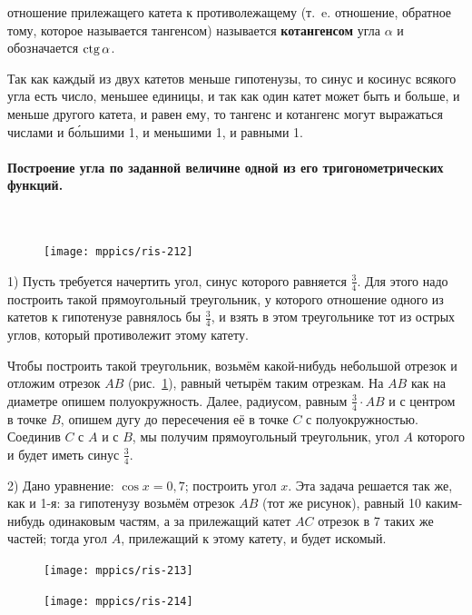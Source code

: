 \documentclass[oneside]{book}
\begin{document}
отношение прилежащего катета к противолежащему (т.~e.
отношение, обратное тому, которое называется тангенсом) называется \textbf{котангенсом} угла $\alpha$ и обозначается $\mathrm{ctg}\,\alpha$.

Так как каждый из двух катетов меньше гипотенузы, то синус и косинус всякого угла есть число, меньшее единицы, и так как один катет может быть и больше, и меньше другого катета, и равен ему, то тангенс и котангенс могут выражаться числами и б\'{о}льшими 1, и меньшими 1, и равными 1.

\paragraph{Построение угла по заданной величине одной из его тригонометрических функций.}\label{1938/204}\ 

\begin{figure}
\centering
\texttt{[image: mppics/ris-212]}
\caption{}\label{1938/ris-212}
\end{figure}

1) Пусть требуется начертить угол, синус которого равняется $\tfrac34$. Для этого надо построить такой прямоугольный треугольник, у которого отношение одного из катетов к гипотенузе равнялось бы $\tfrac34$, и взять в этом треугольнике тот из острых углов, который противолежит этому катету.

{\sloppy

Чтобы построить такой треугольник, возьмём какой-нибудь небольшой отрезок и отложим отрезок $AB$ (рис.~\ref{1938/ris-212}), равный четырём таким отрезкам.
На $AB$ как на диаметре опишем полуокружность.
Далее, радиусом, равным $\tfrac34\cdot AB$ и с центром в точке $B$, опишем дугу до пересечения её в точке $C$ с полуокружностью.
Соединив $C$ с $A$ и с $B$, мы получим прямоугольный треугольник, угол $A$ которого и будет иметь синус $\tfrac34$. %

}

2) Дано уравнение:
$\cos x = 0{,}7$;
построить угол $x$.
Эта задача решается так же, как и 1-я:
за гипотенузу возьмём отрезок $AB$ (тот же рисунок), равный 10 каким-нибудь одинаковым частям, а за прилежащий катет $AC$ отрезок в 7 таких же частей;
тогда угол $A$, прилежащий к этому катету, и будет искомый.

\begin{figure}
\centering
\texttt{[image: mppics/ris-213]}
\caption{}\label{1938/ris-213}
\bigskip
\texttt{[image: mppics/ris-214]}
\caption{}\label{1938/ris-214}
\end{figure}
\end{document}
